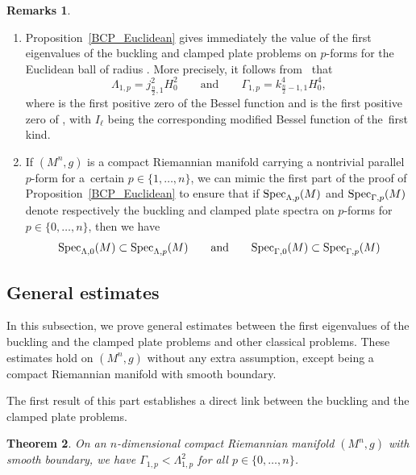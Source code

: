 \documentclass[pdftex]{sigma}
\numberwithin{equation}{section}
\newtheorem{Theorem}{Theorem}[section]
\theoremstyle{definition}
\newtheorem{Remarks}[Theorem]{Remarks}
\begin{document}
\begin{Remarks}\quad
\begin{enumerate}\itemsep=0pt
\item Proposition~\ref{BCP_Euclidean} gives immediately the value of the first eigenvalues of the buckling and clamped plate problems on $p$-forms for the Euclidean ball of radius .
More precisely, it follows from~\cite[Section~1]{AL} that
\[
\Lambda_{1,p}=j_{\frac{n}{2},1}^2 H_0^2\qquad\text{and}\qquad\Gamma_{1,p}=k_{\frac{n}{2}-1,1}^4 H_0^4,
\]
where  is the first positive zero of the Bessel function  and  is the first positive zero of , with $I_\ell$ being the corresponding modified Bessel function of the~first kind.

\item If $(M^n,g)$ is a compact Riemannian manifold carrying a nontrivial parallel $p$-form for a~certain $p\in\{1,\dots,n\}$, we can mimic the first part of the proof of Proposition~\ref{BCP_Euclidean} to ensure that if ${\rm Spec}_{\Lambda,p}(M)$ and ${\rm Spec}_{\Gamma,p}(M)$ denote respectively the buckling and clamped plate spectra on $p$-forms for $p\in\{0,\dots,n\}$, then we have
\[
{\rm Spec}_{\Lambda,0}(M)\subset {\rm Spec}_{\Lambda,p}(M) \qquad\text{and}\qquad {\rm Spec}_{\Gamma,0}(M)\subset {\rm Spec}_{\Gamma,p}(M)
\]
\end{enumerate}
\end{Remarks}

\subsection{General estimates}

In this subsection, we prove general estimates between the first eigenvalues of the buckling and the clamped plate problems and other classical problems. These estimates hold on $(M^n,g)$ without any extra assumption, except being a compact Riemannian manifold with smooth boundary.

The first result of this part establishes a direct link between the buckling and the clamped plate problems.
\begin{Theorem}\label{BuckCP}
On an $n$-dimensional compact Riemannian manifold $(M^n,g)$ with smooth boundary, we have $\Gamma_{1,p}<\Lambda_{1,p}^2$ for all $p\in\{0,\dots,n\}$.
\end{Theorem}
\end{document}
